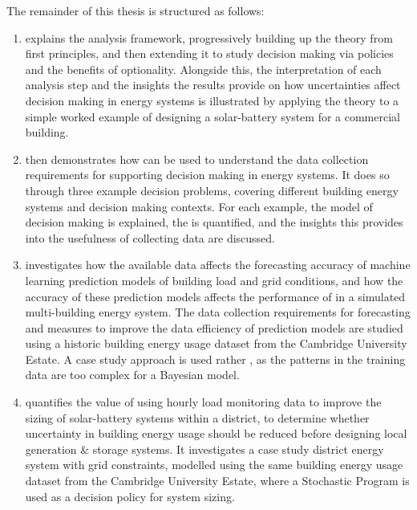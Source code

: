 The remainder of this thesis is structured as follows:
\begin{enumerate}[wide, labelwidth=!, labelindent=0pt]
    \item[\it\Cref{chap:methodology}] explains the  analysis framework, progressively building up the theory from first principles, and then extending it to study decision making via policies and the benefits of optionality. Alongside this, the interpretation of each analysis step and the insights the results provide on how uncertainties affect decision making in energy systems is illustrated by applying the theory to a simple worked example of designing a solar-battery system for a commercial building.

    \item[\it\Cref{chap:demonstrations}] then demonstrates how  can be used to understand the data collection requirements for supporting decision making in energy systems. It does so through three example decision problems, covering different building energy systems and decision making contexts. For each example, the model of decision making is explained, the  is quantified, and the insights this provides into the usefulness of collecting data are discussed.

    \item[\it\Cref{chap:forecasting}] investigates how the available data affects the forecasting accuracy of machine learning prediction models of building load and grid conditions, and how the accuracy of these prediction models affects the performance of  in a simulated multi-building energy system. The data collection requirements for forecasting and measures to improve the data efficiency of prediction models are studied using a historic building energy usage dataset from the Cambridge University Estate. A case study approach is used rather , as the patterns in the training data are too complex for a Bayesian model.

    \item[\it\Cref{chap:districts}] quantifies the value of using hourly load monitoring data to improve the sizing of solar-battery systems within a district, to determine whether uncertainty in building energy usage should be reduced before designing local generation \& storage systems. It investigates a case study district energy system with grid constraints, modelled using the same building energy usage dataset from the Cambridge University Estate, where a Stochastic Program is used as a decision policy for system sizing.


\end{enumerate}
